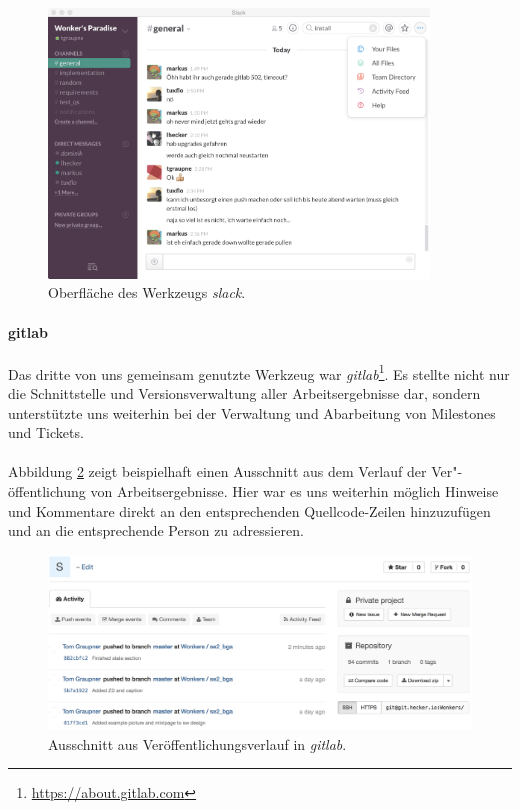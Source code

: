 \hspace*{2cm}
\begin{figure}[h!]
	\centering
	\includegraphics[width=0.9\textwidth]{images/slack.png}
	\caption{Oberfläche des Werkzeugs \textit{slack}.}
	\label{slack}
\end{figure}

\newpage
\paragraph{gitlab}Das dritte von uns gemeinsam genutzte Werkzeug war \textit{gitlab}\footnote{\url{https://about.gitlab.com}}. Es stellte nicht nur die Schnittstelle und Versionsverwaltung aller Arbeitsergebnisse dar, sondern unterstützte uns weiterhin bei der Verwaltung und Abarbeitung von Milestones und Tickets.

\paragraph{}Abbildung \ref{gl_commit} zeigt beispielhaft einen Ausschnitt aus dem Verlauf der Ver"-öffentlichung von Arbeitsergebnisse. Hier war es uns weiterhin möglich Hinweise und Kommentare direkt an den entsprechenden Quellcode-Zeilen hinzuzufügen und an die entsprechende Person zu adressieren.

\hspace*{1cm}
\begin{figure}[h!]
	\centering
	\includegraphics[width=\textwidth]{images/gl_commits.png}
	\caption{Ausschnitt aus Veröffentlichungsverlauf in \textit{gitlab}.}
	\label{gl_commit}
\end{figure}

